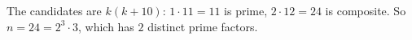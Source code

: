 The candidates are $k(k+10)$: $1\cdot11=11$ is prime, $2\cdot12=24$ is composite. So $n=24=2^3\cdot3$, which has $\boxed{2}$ distinct prime factors.
